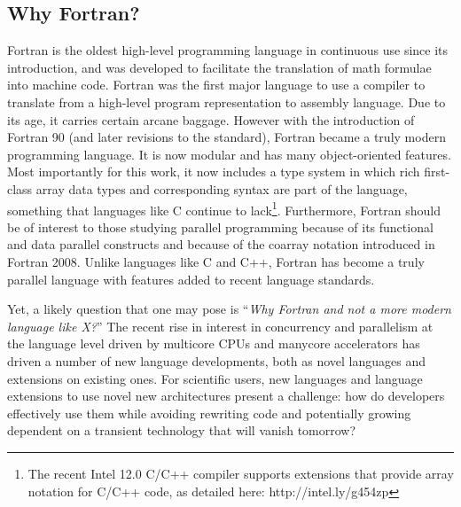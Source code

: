 \subsection{Why Fortran?}

Fortran is the oldest high-level programming language in continuous
use since its introduction, and was developed to facilitate the
translation of math formulae into machine code. Fortran was the first
major language to use a compiler to translate from a high-level
program representation to assembly language. Due to its age, it
carries certain arcane baggage.  However with the introduction of
Fortran 90 (and later revisions to the standard), Fortran became a
truly modern programming language.  It is now modular and has many
object-oriented features.  Most importantly for this work, it now
includes a type system in which rich first-class array data types and
corresponding syntax are part of the language, something that
languages like C continue to lack\footnote{The recent Intel 12.0 C/C++
  compiler supports extensions that provide array notation for C/C++
  code, as detailed here: http://intel.ly/g454zp}.  Furthermore,
Fortran should be of interest to those studying parallel programming
because of its functional and data parallel constructs and because of
the coarray notation introduced in Fortran 2008. Unlike languages like
C and C++, Fortran has become a truly parallel language with features
added to recent language standards.


Yet, a likely question that one may pose is ``\emph{Why Fortran and
  not a more modern language like X?}''  The recent rise in interest
in concurrency and parallelism at the language level driven by
multicore CPUs and manycore accelerators has driven a number of new
language developments, both as novel languages and extensions on
existing ones.  For scientific users, new languages and language
extensions to use novel new architectures present a challenge: how do
developers effectively use them while avoiding rewriting code
and potentially growing dependent on a transient technology that will
vanish tomorrow?


